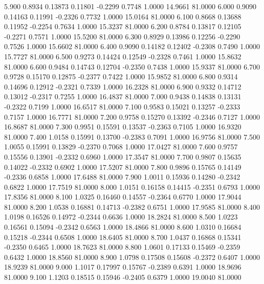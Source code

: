    5.900   0.8934   0.13873   0.11801  -0.2299   0.7748   1.0000  14.9661  81.0000
   6.000   0.9090   0.14163   0.11991  -0.2326   0.7732   1.0000  15.0164  81.0000
   6.100   0.8668   0.13688   0.11952  -0.2254   0.7634   1.0000  15.3237  81.0000
   6.200   0.8784   0.13817   0.12105  -0.2271   0.7571   1.0000  15.5200  81.0000
   6.300   0.8929   0.13986   0.12256  -0.2290   0.7526   1.0000  15.6602  81.0000
   6.400   0.9090   0.14182   0.12402  -0.2308   0.7490   1.0000  15.7727  81.0000
   6.500   0.9273   0.14424   0.12549  -0.2328   0.7461   1.0000  15.8632  81.0000
   6.600   0.9484   0.14743   0.12704  -0.2350   0.7438   1.0000  15.9337  81.0000
   6.700   0.9728   0.15170   0.12875  -0.2377   0.7422   1.0000  15.9852  81.0000
   6.800   0.9314   0.14696   0.12912  -0.2321   0.7339   1.0000  16.2328  81.0000
   6.900   0.9332   0.14712   0.13012  -0.2317   0.7255   1.0000  16.4837  81.0000
   7.000   0.9438   0.14838   0.13131  -0.2322   0.7199   1.0000  16.6517  81.0000
   7.100   0.9583   0.15021   0.13257  -0.2333   0.7157   1.0000  16.7771  81.0000
   7.200   0.9758   0.15270   0.13392  -0.2346   0.7127   1.0000  16.8687  81.0000
   7.300   0.9951   0.15591   0.13537  -0.2363   0.7105   1.0000  16.9320  81.0000
   7.400   1.0158   0.15991   0.13700  -0.2383   0.7091   1.0000  16.9756  81.0000
   7.500   1.0055   0.15991   0.13829  -0.2370   0.7068   1.0000  17.0427  81.0000
   7.600   0.9757   0.15556   0.13901  -0.2332   0.6960   1.0000  17.3547  81.0000
   7.700   0.9807   0.15635   0.14022  -0.2332   0.6902   1.0000  17.5207  81.0000
   7.800   0.9896   0.15765   0.14149  -0.2336   0.6858   1.0000  17.6488  81.0000
   7.900   1.0011   0.15936   0.14280  -0.2342   0.6822   1.0000  17.7519  81.0000
   8.000   1.0151   0.16158   0.14415  -0.2351   0.6793   1.0000  17.8356  81.0000
   8.100   1.0325   0.16460   0.14557  -0.2364   0.6770   1.0000  17.9044  81.0000
   8.200   1.0538   0.16881   0.14713  -0.2382   0.6751   1.0000  17.9585  81.0000
   8.400   1.0198   0.16526   0.14972  -0.2344   0.6636   1.0000  18.2824  81.0000
   8.500   1.0223   0.16561   0.15094  -0.2342   0.6563   1.0000  18.4866  81.0000
   8.600   1.0310   0.16684   0.15218  -0.2344   0.6508   1.0000  18.6405  81.0000
   8.700   1.0437   0.16868   0.15341  -0.2350   0.6465   1.0000  18.7623  81.0000
   8.800   1.0601   0.17133   0.15469  -0.2359   0.6432   1.0000  18.8560  81.0000
   8.900   1.0798   0.17508   0.15608  -0.2372   0.6407   1.0000  18.9239  81.0000
   9.000   1.1017   0.17997   0.15767  -0.2389   0.6391   1.0000  18.9696  81.0000
   9.100   1.1203   0.18515   0.15946  -0.2405   0.6379   1.0000  19.0040  81.0000
